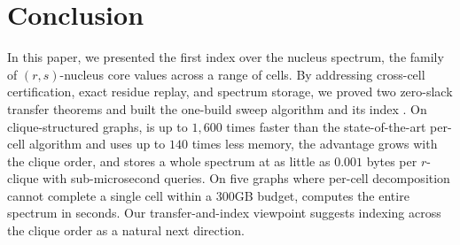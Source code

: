 \section{Conclusion}
\label{sec:conclusion}

In this paper, we presented the first index over the nucleus spectrum, the family of $(r,s)$-nucleus core values across a range of cells.
%
By addressing cross-cell certification, exact residue replay, and spectrum storage, we proved two zero-slack transfer theorems and built the one-build sweep algorithm \specnd{} and its index \nsi.
%
On clique-structured graphs, \specnd{} is up to $1{,}600$ times faster than the state-of-the-art per-cell algorithm and uses up to $140$ times less memory, the advantage grows with the clique order, and \nsi{} stores a whole spectrum at as little as $0.001$ bytes per $r$-clique with sub-microsecond queries.
%
On five graphs where per-cell decomposition cannot complete a single cell within a $300$GB budget, \specnd{} computes the entire spectrum in seconds.
%
Our transfer-and-index viewpoint suggests indexing across the clique order as a natural next direction.
